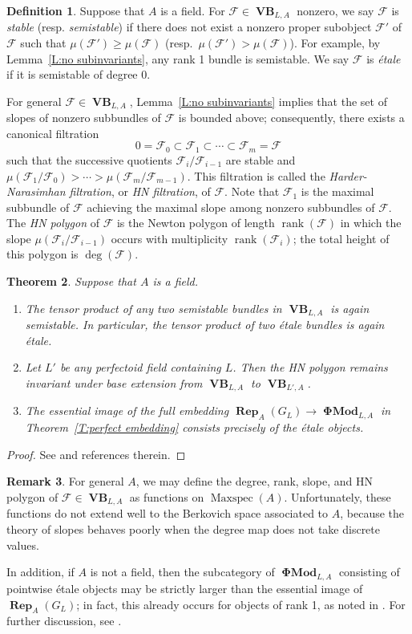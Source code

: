 \documentclass[12pt]{amsart}
\newtheorem{theorem}{Theorem}[section]
\theoremstyle{definition}
\newtheorem{defn}[theorem]{Definition}
\newtheorem{remark}[theorem]{Remark}
\numberwithin{equation}{theorem}
\newcommand{\calF}{\mathcal{F}}
\DeclareMathOperator{\Maxspec}{Maxspec}
\DeclareMathOperator{\PhiMod}{\mathbf{\Phi Mod}}
\DeclareMathOperator{\rank}{rank}
\DeclareMathOperator{\Rep}{\mathbf{Rep}}
\DeclareMathOperator{\VB}{\mathbf{VB}}
\begin{document}
\begin{defn}
Suppose that $A$ is a field. For $\calF \in \VB_{L,A}$ nonzero, we say $\calF$ is \emph{stable} (resp. \emph{semistable}) if there does not exist a nonzero proper subobject $\calF'$ of $\calF$ such that $\mu(\calF') \geq \mu(\calF)$ (resp.\ $\mu(\calF') > \mu(\calF)$). 
For example, by Lemma~\ref{L:no subinvariants}, any rank 1 bundle is semistable.
We say $\calF$ is \emph{\'etale} if it is semistable of degree 0.

For general $\calF \in \VB_{L,A}$, Lemma~\ref{L:no subinvariants} implies that the set of slopes of nonzero subbundles of $\calF$ is bounded above; consequently, there exists a canonical filtration
\[
0 = \calF_0 \subset \calF_1 \subset \cdots \subset \calF_m = \calF
\]
such that the successive quotients $\calF_i/\calF_{i-1}$ are stable and
$\mu(\calF_1/\calF_0) > \cdots > \mu(\calF_m/\calF_{m-1})$. 
This filtration is called the \emph{Harder-Narasimhan filtration}, or \emph{HN filtration}, of $\calF$. Note that $\calF_1$ is the maximal subbundle of $\calF$ achieving the maximal slope among nonzero subbundles of $\calF$. 
The \emph{HN polygon} of $\calF$ is the Newton polygon of length $\rank(\calF)$ in which the slope $\mu(\calF_i/\calF_{i-1})$ occurs with multiplicity $\rank(\calF_i)$; the total height of this polygon is $\deg(\calF)$.
\end{defn}

\begin{theorem} \label{T:etale properties}
Suppose that $A$ is a field.
\begin{enumerate}
\item[(a)] The tensor product of any two semistable bundles in $\VB_{L,A}$ is again semistable. In particular, the tensor product of two \'etale bundles is again \'etale.
\item[(b)]
Let $L'$ be any perfectoid field containing $L$. Then the HN polygon remains invariant under base extension from $\VB_{L,A}$ to $\VB_{L',A}$.
\item[(c)] The essential image of the full embedding $\Rep_A(G_L) \to \PhiMod_{L,A}$
in Theorem~\ref{T:perfect embedding} consists precisely of the \'etale objects.
\end{enumerate}
\end{theorem}
\begin{proof}
See \cite[\S 4]{kedlaya-liu1} and references therein.
\end{proof}

\begin{remark}
For general $A$, we may define the degree, rank, slope, and HN polygon of $\calF \in \VB_{L,A}$ as functions on $\Maxspec(A)$. Unfortunately, these functions do not extend well to the Berkovich space associated to $A$, because the theory of slopes behaves poorly when the degree map does not take discrete values.

In addition, if $A$ is not a field, then the subcategory of $\PhiMod_{L,A}$ consisting of pointwise \'etale objects may be strictly larger than the essential image of $\Rep_A(G_L)$; in fact, this already occurs for objects of rank 1, as noted in \cite[Remarque 4.2.10]{berger-colmez}.
For further discussion, see \cite{kedlaya-liu-families}.
\end{remark}
\end{document}
